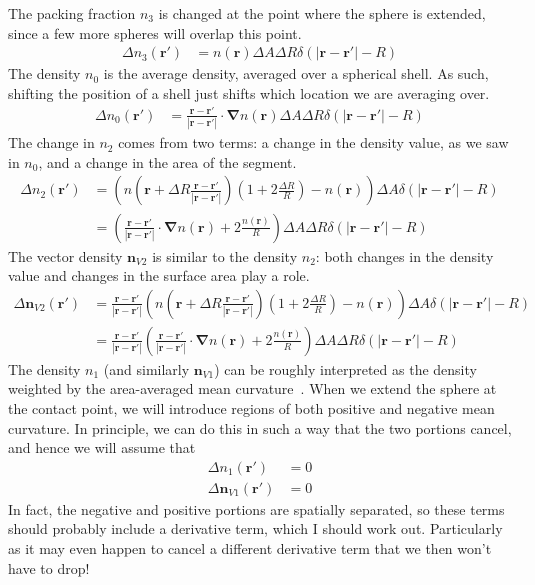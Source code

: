 \documentclass[letterpaper,twocolumn,amsmath,amssymb,prb]{revtex4-1}
\begin{document}
\begin{widetext}
The packing fraction $n_3$ is changed at the point where the sphere is
extended, since a few more spheres will overlap this point.
\begin{align}
  \Delta n_3(\mathbf{r}') &= n(\mathbf{r})\Delta A \Delta R
  \delta(|\mathbf{r}-\mathbf{r}'| - R)
\end{align}
The density $n_0$ is the average density, averaged over a spherical
shell.  As such, shifting the position of a shell just shifts which
location we are averaging over.
\begin{align}
  \Delta n_0(\mathbf{r}') &=
    \frac{\mathbf{r}-\mathbf{r}'}{|\mathbf{r}-\mathbf{r}'|}\cdot
      \mathbf{\nabla}n(\mathbf{r}) \Delta A \Delta R
    \delta(|\mathbf{r}-\mathbf{r}'|-R)
\end{align}
The change in $n_2$ comes from two terms: a change in the density value, as
we saw in $n_0$, and a change in the area of the segment.
\begin{align}
  \Delta n_2(\mathbf{r}') &=
  \left(n\left(\mathbf{r} + \Delta R
  \frac{\mathbf{r}-\mathbf{r}'}{|\mathbf{r}-\mathbf{r}'|}\right)\left(1+2\frac{\Delta
  R}{R}\right)- n(\mathbf{r})\right) \Delta A
  \delta(|\mathbf{r}-\mathbf{r}'|-R) \\
  &=
  \left(\frac{\mathbf{r}-\mathbf{r}'}{|\mathbf{r}-\mathbf{r}'|}\cdot
    \mathbf{\nabla}n(\mathbf{r}) + 2 \frac{n(\mathbf{r})}{R}
    \right) \Delta A \Delta R
  \delta(|\mathbf{r}-\mathbf{r}'|-R)
\end{align}
The vector density $\mathbf{n}_{V2}$ is similar to the density
$n_2$: both changes in the density value and changes in the surface
area play a role.
\begin{align}
  \Delta \mathbf{n}_{V2}(\mathbf{r}') &=
  \frac{\mathbf{r}-\mathbf{r}'}{|\mathbf{r}-\mathbf{r}'|}
  \left(n\left(\mathbf{r} + \Delta R
  \frac{\mathbf{r}-\mathbf{r}'}{|\mathbf{r}-\mathbf{r}'|}\right)\left(1+2\frac{\Delta
  R}{R}\right)- n(\mathbf{r})\right) \Delta A
  \delta(|\mathbf{r}-\mathbf{r}'|-R) \\
  &=
  \frac{\mathbf{r}-\mathbf{r}'}{|\mathbf{r}-\mathbf{r}'|}
  \left(\frac{\mathbf{r}-\mathbf{r}'}{|\mathbf{r}-\mathbf{r}'|}\cdot
    \mathbf{\nabla}n(\mathbf{r}) + 2 \frac{n(\mathbf{r})}{R}
    \right) \Delta A \Delta R
  \delta(|\mathbf{r}-\mathbf{r}'|-R) 
\end{align}
The density $n_1$ (and similarly $\mathbf{n}_{V1}$) can be roughly
interpreted as the density weighted by the area-averaged mean
curvature~\cite{oversteegen2005general, roth2010review}.  When we
extend the sphere at the contact point, we will introduce regions of
both positive and negative mean curvature.  In principle, we can do
this in such a way that the two portions cancel, and hence we will
assume that
\begin{align}
  \Delta n_1(\mathbf{r}') &= 0 \\
  \Delta \mathbf{n}_{V1}(\mathbf{r}') &= 0
\end{align}
In fact, the negative and positive portions are spatially separated,
so these terms should probably include a derivative term, which I
should work out.  Particularly as it may even happen to cancel a
different derivative term that we then won't have to drop!


\end{widetext}
\end{document}
